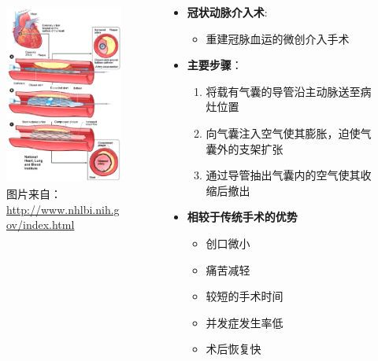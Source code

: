 \begin{frame}
\begin{columns}[onlytextwidth]
\begin{column}{0.4\textwidth}
\begin{figure}[t]
\includegraphics[height=170pt]{../../Figures/background/phauthuatmachmau_stent.eps}
\caption[冠状动脉介入术]{图片来自：\\\url{http://www.nhlbi.nih.gov/index.html}}
\end{figure}
\end{column}
\begin{column}{0.5\textwidth}
\begin{itemize}
\item \textbf{冠状动脉介入术}: 
\begin{itemize}
\item \footnotesize{重建冠脉血运的微创介入手术}
\end{itemize}
\item \textbf{主要步骤}：
\begin{enumerate}[A]
\item \footnotesize{将载有气囊的导管沿主动脉送至病灶位置}
\item \footnotesize{向气囊注入空气使其膨胀，迫使气囊外的支架扩张}
\item \footnotesize{通过导管抽出气囊内的空气使其收缩后撤出}
\end{enumerate}
\end{itemize}
\begin{itemize}
\pause \item \textbf{相较于传统手术的优势}
\begin{itemize}
\item 创口微小
\item 痛苦减轻
\item 较短的手术时间
\item 并发症发生率低
\item 术后恢复快
\end{itemize}
\end{itemize}
\end{column}
\end{columns}
\end{frame}

